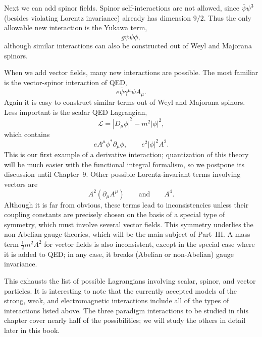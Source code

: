 Next we can add spinor fields.  Spinor self-interactions are not allowed,
since $\bar{\psi}\psi^3$ (besides violating Lorentz invariance) already has
dimension $9/2$.  Thus the only allowable new interaction is the Yukawa term,
\begin{equation}
  g\bar{\psi}\psi\phi,
\end{equation}
although similar interactions can also be constructed out of Weyl and
Majorana spinors.

When we add vector fields, many new interactions are possible.  The most
familiar is the vector-spinor interaction of QED,
\begin{equation}
  e\bar{\psi}\gamma^\mu\psi A_\mu .
\end{equation}
Again it is easy to construct similar terms out of Weyl and Majorana
spinors.  Less important is the scalar QED Lagrangian,
\begin{equation}
  \mathcal{L} = |D_\mu\phi|^2 - m^2|\phi|^2,
\end{equation}
which contains
\begin{equation}
  eA^\mu\phi^{*}\partial_\mu\phi,\qquad e^2|\phi|^2A^2 .
\end{equation}
This is our first example of a derivative interaction; quantization of this
theory will be much easier with the functional integral formalism, so we
postpone its discussion until Chapter~9.  Other possible Lorentz-invariant
terms involving vectors are
\begin{equation}
  A^2(\partial_\mu A^\mu) \qquad\text{and}\qquad A^4 .
\end{equation}
Although it is far from obvious, these terms lead to inconsistencies unless
their coupling constants are precisely chosen on the basis of a special type
of symmetry, which must involve several vector fields.  This symmetry
underlies the non-Abelian gauge theories, which will be the main subject of
Part~III.  A mass term $\tfrac{1}{2}m^2A^2$ for vector fields is also
inconsistent, except in the special case where it is added to QED; in any
case, it breaks (Abelian or non-Abelian) gauge invariance.

This exhausts the list of possible Lagrangians involving scalar, spinor, and
vector particles.  It is interesting to note that the currently accepted
models of the strong, weak, and electromagnetic interactions include all of
the types of interactions listed above.  The three paradigm interactions to
be studied in this chapter cover nearly half of the possibilities; we will
study the others in detail later in this book.

